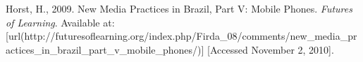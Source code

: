 \myRefs%
{%
\startREF%
Horst, H., 2009. New Media Practices in Brazil, Part V: Mobile Phones. {\em Futures of Learning}. Available at:  [url(http://futuresoflearning.org/index.php/Firda_08/comments/new_media_practices_in_brazil_part_v_mobile_phones/)] [Accessed November 2, 2010].
\nl
\stopREF%
}

\stopenvironment